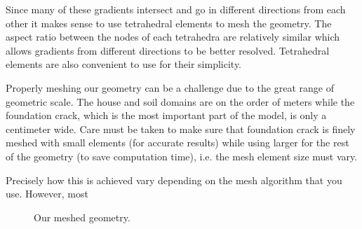 Since many of these gradients intersect and go in different directions from each other it makes sense to use tetrahedral elements to mesh the geometry.
The aspect ratio between the nodes of each tetrahedra are relatively similar which allows gradients from different directions to be better resolved.
Tetrahedral elements are also convenient to use for their simplicity.\par

Properly meshing our geometry can be a challenge due to the great range of geometric scale.
The house and soil domains are on the order of meters while the foundation crack, which is the most important part of the model, is only a centimeter wide.
Care must be taken to make sure that foundation crack is finely meshed with small elements (for accurate results) while using larger for the rest of the geometry (to save computation time), i.e. the mesh element size must vary.\par

Precisely how this is achieved vary depending on the mesh algorithm that you use.
However, most

\begin{figure}[htb!]
  \caption{Our meshed geometry.}
  \label{fig:meshed_geometry}
\end{figure}
